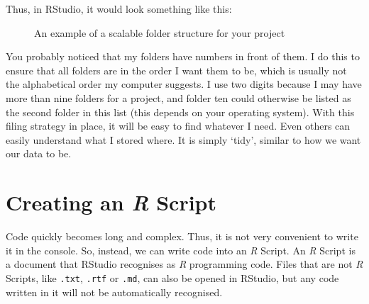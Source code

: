 \documentclass[
  letterpaper,
]{krantz}
\begin{document}
Thus, in RStudio, it would look something like this:

\begin{figure}


\caption{\label{fig-folder-structure}An example of a scalable folder
structure for your project}

\end{figure}%

You probably noticed that my folders have numbers in front of them. I do
this to ensure that all folders are in the order I want them to be,
which is usually not the alphabetical order my computer suggests. I use
two digits because I may have more than nine folders for a project, and
folder ten could otherwise be listed as the second folder in this list
(this depends on your operating system). With this filing strategy in
place, it will be easy to find whatever I need. Even others can easily
understand what I stored where. It is simply `tidy', similar to how we
want our data to be.

\section{\texorpdfstring{Creating an \emph{R}
Script}{Creating an R Script}}\label{sec-creating-an-r-script}

Code quickly becomes long and complex. Thus, it is not very convenient
to write it in the console. So, instead, we can write code into an
\emph{R} Script. An \emph{R} Script is a document that RStudio
recognises as \emph{R} programming code. Files that are not \emph{R}
Scripts, like \texttt{.txt}, \texttt{.rtf} or \texttt{.md}, can also be
opened in RStudio, but any code written in it will not be automatically
recognised.
\end{document}
